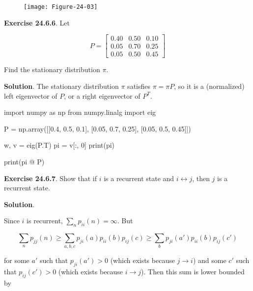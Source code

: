 \begin{figure}[H]
\centering
\texttt{[image: Figure-24-03]}
\end{figure}

\textbf{Exercise 24.6.6}. Let

\[ P = \begin{bmatrix}
0.40 & 0.50 & 0.10 \\
0.05 & 0.70 & 0.25 \\
0.05 & 0.50 & 0.45
\end{bmatrix}\]

Find the stationary distribution \(\pi\).

\textbf{Solution}. The stationary distribution \(\pi\) satisfies
\(\pi = \pi P\), so it is a (normalized) left eigenvector of \(P\), or a
right eigenvector of \(P^T\).

\begin{python}
import numpy as np
from numpy.linalg import eig

P = np.array([[0.4, 0.5, 0.1], [0.05, 0.7, 0.25], [0.05, 0.5, 0.45]])
\end{python}

\begin{python}
w, v = eig(P.T)
pi = v[:, 0]
print(pi)
\end{python}

\begin{console}
[0.11041049 0.89708523 0.42784065]
\end{console}

\begin{python}
print(pi @ P)
\end{python}

\begin{console}
[0.11041049 0.89708523 0.42784065]
\end{console}

\textbf{Exercise 24.6.7}. Show that if \(i\) is a recurrent state and
\(i \leftrightarrow j\), then \(j\) is a recurrent state.

\textbf{Solution}.

Since \(i\) is recurrent, \(\sum_{n} p_{ii}(n) = \infty\). But

\[\sum_{n} p_{jj}(n) \geq \sum_{a, b, c} p_{ji}(a) p_{ii}(b) p_{ij}(c) \geq \sum_b p_{ji}(a') p_{ii}(b) p_{ij}(c')\]

for some \(a'\) such that \(p_{ji}(a') > 0\) (which exists because
\(j \rightarrow i\)) and some \(c'\) such that \(p_{ij}(c') > 0\) (which
exists because \(i \rightarrow j\)). Then this sum is lower bounded by

